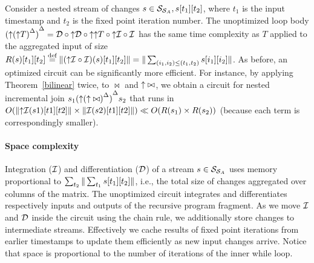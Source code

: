 Consider a nested stream of changes $s \in \mathcal{S}_{\mathcal{S}_{A}}, s[t_1][t_2]$,
where $t_1$ is the input timestamp and $t_2$ is the fixed point iteration number.
The unoptimized loop body ${({\uparrow}{({\uparrow}T)}^{\Delta})}^{\Delta} = 
\mathcal{D} \circ {\uparrow}\mathcal{D} \circ {\uparrow}{\uparrow}T
\circ {\uparrow}\mathcal{I} \circ \mathcal{I}$ has the same time complexity as $T$ applied to the
aggregated input of size $R(s)[t_1][t_2] \stackrel{\textrm{\scriptsize def}}{=} \| ({\uparrow}\mathcal{I} \circ
\mathcal{I})(s)[t_1][t_2] \| = \| \sum_{(i_1,i_2) \leq (t_1, t_2)} s[i_1][i_2] \|$.  As
before, an optimized circuit can be significantly more efficient.  For instance,
by applying Theorem~\ref{bilinear} twice, to $\bowtie$ and ${\uparrow}\bowtie$, we
obtain a circuit for nested incremental join $s_1
{({\uparrow}{({\uparrow}\bowtie)}^{\Delta})}^{\Delta} s_2$ that runs in
$O(\| {\uparrow}\mathcal{I}(s1)[t1][t2] \| \times \| \mathcal{I}(s2)[t1][t2] \|) \ll 
O(R(s_1) \times R(s_2))$ (because each term is correspondingly smaller).

\paragraph{Space complexity} Integration ($\mathcal{I}$) and differentiation ($\mathcal{D}$) of a
stream $s \in \mathcal{S}_{\mathcal{S}_{A}}$ uses memory proportional to
$\sum_{t_2}\| \sum_{t_1}s[t_1][t_2] \|$, i.e., the total size of changes
aggregated over columns of the matrix.  The unoptimized circuit integrates
and differentiates respectively inputs and outputs of the recursive program
fragment.  As we move $\mathcal{I}$ and $\mathcal{D}$ inside the circuit using the chain rule, we
additionally store changes to intermediate streams.  Effectively we cache results of 
fixed point iterations from earlier timestamps to update them efficiently as new input changes arrive.
Notice that space is proportional to the number of iterations of the inner while loop.



